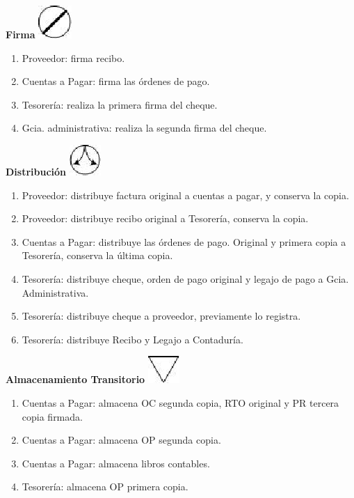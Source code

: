 \begin{center}
  \textbf{Firma}
  \includegraphics{./Images/Simbolos/simbolo-Firma.png}
\end{center}
\begin{enumerate}
  \item Proveedor: firma recibo.
  \item Cuentas a Pagar: firma las órdenes de pago.
  \item Tesorería: realiza la primera firma del cheque.
  \item Gcia. administrativa: realiza la segunda firma del cheque.
\end{enumerate}

\begin{center}
  \textbf{Distribución}
  \includegraphics{./Images/Simbolos/simbolo-Distribucion.png}
\end{center}
\begin{enumerate}
  \item Proveedor: distribuye factura original a cuentas a pagar, y conserva la copia.
  \item Proveedor: distribuye recibo original a Tesorería, conserva la copia.
  \item Cuentas a Pagar: distribuye las órdenes de pago. Original y primera copia a Tesorería, conserva la \'ultima copia.
  \item Tesorería: distribuye cheque, orden de pago original y legajo de pago a Gcia. Administrativa.
  \item Tesorería: distribuye cheque a proveedor, previamente lo registra.
  \item Tesorería: distribuye Recibo y Legajo a Contaduría.
\end{enumerate}

\begin{center}
  \textbf{Almacenamiento Transitorio}
  \includegraphics{./Images/Simbolos/simbolo-Almacenamiento-Transitorio.png}
\end{center}
\begin{enumerate}
  \item Cuentas a Pagar: almacena OC segunda copia, RTO original y PR tercera copia firmada.
  \item Cuentas a Pagar: almacena OP segunda copia.
  \item Cuentas a Pagar: almacena libros contables.
  \item Tesorería: almacena OP primera copia.
\end{enumerate}

